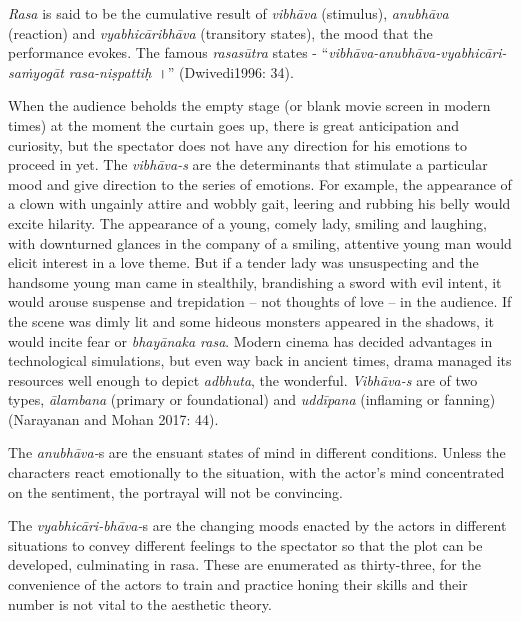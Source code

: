 \textit{Rasa} is said to be the cumulative result of \textit{vibhāva} (stimulus), \textit{anubhāva} (reaction) and \textit{vyabhicāribhāva} (transitory states), the mood that the performance evokes. The famous \textit{rasasūtra} states - “\textit{vibhāva-anubhāva-vyabhicāri-saṁyogāt rasa-niṣpattiḥ}~।” (Dwivedi1996: 34).

When the audience beholds the empty stage (or blank movie screen in modern times) at the moment the curtain goes up, there is great anticipation and curiosity, but the spectator does not have any direction for his emotions to proceed in yet. The \textit{vibhāva-s} are the determinants that stimulate a particular mood and give direction to the series of emotions. For example, the appearance of a clown with ungainly attire and wobbly gait, leering and rubbing his belly would excite hilarity. The appearance of a young, comely lady, smiling and laughing, with downturned glances in the company of a smiling, attentive young man would elicit interest in a love theme. But if a tender lady was unsuspecting and the handsome young man came in stealthily, brandishing a sword with evil intent, it would arouse suspense and trepidation – not thoughts of love – in the audience. If the scene was dimly lit and some hideous monsters appeared in the shadows, it would incite fear or \textit{bhayānaka rasa}. Modern cinema has decided advantages in technological simulations, but even way back in ancient times, drama managed its resources well enough to depict \textit{adbhuta}, the wonderful. \textit{Vibhāva-s }are of two types, \textit{ālambana} (primary or foundational) and \textit{uddīpana }(inflaming or fanning) (Narayanan and Mohan 2017: 44).

The \textit{anubhāva-}s are the ensuant states of mind in different conditions. Unless the characters react emotionally to the situation, with the actor’s mind concentrated on the sentiment, the portrayal will not be convincing.

The \textit{vyabhicāri-bhāva-}s are the changing moods enacted by the actors in different situations to convey different feelings to the spectator so that the plot can be developed, culminating in rasa. These are enumerated as thirty-three, for the convenience of the actors to train and practice honing their skills and their number is not vital to the aesthetic theory.

